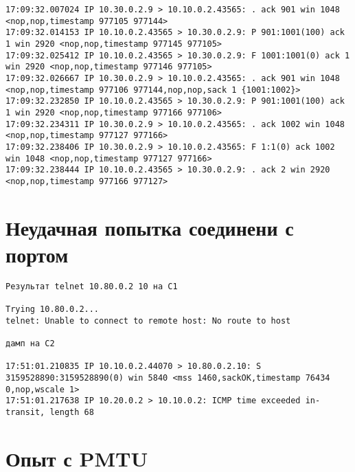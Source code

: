\documentclass[a4paper,12pt]{article}
\begin{document}
\begin{Verbatim}
17:09:32.007024 IP 10.30.0.2.9 > 10.10.0.2.43565: . ack 901 win 1048 <nop,nop,timestamp 977105 977144>
17:09:32.014153 IP 10.10.0.2.43565 > 10.30.0.2.9: P 901:1001(100) ack 1 win 2920 <nop,nop,timestamp 977145 977105>
17:09:32.025412 IP 10.10.0.2.43565 > 10.30.0.2.9: F 1001:1001(0) ack 1 win 2920 <nop,nop,timestamp 977146 977105>
17:09:32.026667 IP 10.30.0.2.9 > 10.10.0.2.43565: . ack 901 win 1048 <nop,nop,timestamp 977106 977144,nop,nop,sack 1 {1001:1002}>
17:09:32.232850 IP 10.10.0.2.43565 > 10.30.0.2.9: P 901:1001(100) ack 1 win 2920 <nop,nop,timestamp 977166 977106>
17:09:32.234311 IP 10.30.0.2.9 > 10.10.0.2.43565: . ack 1002 win 1048 <nop,nop,timestamp 977127 977166>
17:09:32.238406 IP 10.30.0.2.9 > 10.10.0.2.43565: F 1:1(0) ack 1002 win 1048 <nop,nop,timestamp 977127 977166>
17:09:32.238444 IP 10.10.0.2.43565 > 10.30.0.2.9: . ack 2 win 2920 <nop,nop,timestamp 977166 977127>
\end{Verbatim}

\section{Неудачная попытка соединени с портом}

\begin{Verbatim}
Результат telnet 10.80.0.2 10 на C1

Trying 10.80.0.2...
telnet: Unable to connect to remote host: No route to host

дамп на C2

17:51:01.210835 IP 10.10.0.2.44070 > 10.80.0.2.10: S 3159528890:3159528890(0) win 5840 <mss 1460,sackOK,timestamp 76434 0,nop,wscale 1>
17:51:01.217638 IP 10.20.0.2 > 10.10.0.2: ICMP time exceeded in-transit, length 68
\end{Verbatim}

\section{Опыт с PMTU}
\end{document}
